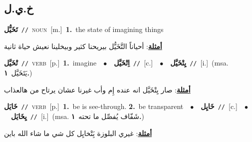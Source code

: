 \documentclass[10pt,a4paper,twoside]{article} %
\begin{document}
\begin{multicols}{2}
\vspace{-3mm}
\subsection*{\color{blue}\foreignlanguage{arabic}{خ.ي.ل}\color{blue}{}} 

{\setlength\topsep{0pt}\textbf{\foreignlanguage{arabic}{تَخَيُّل}}\ {\color{gray}\texttt{//}\color{black}}\ \textsc{noun}\ [m.]\ \textbf{1.}~the state of imagining things\  \begin{flushright}\color{gray}\foreignlanguage{arabic}{\textbf{\underline{\foreignlanguage{arabic}{أمثلة}}}: أحياناً التَّخَيُّل بيريحنا كثير وبيخلينا نعيش حياة ثانية}\end{flushright}\color{black}} \vspace{2mm}

{\setlength\topsep{0pt}\textbf{\foreignlanguage{arabic}{تْخَيَّل}}\ {\color{gray}\texttt{//}\color{black}}\ \textsc{verb}\ [p.]\ \textbf{1.}~imagine\ \ $\bullet$\ \ \setlength\topsep{0pt}\textbf{\foreignlanguage{arabic}{اِتْخَيَّل}}\ {\color{gray}\texttt{//}\color{black}}\ [c.]\ \ $\bullet$\ \ \setlength\topsep{0pt}\textbf{\foreignlanguage{arabic}{يِتْخَيَّل}}\ {\color{gray}\texttt{//}\color{black}}\ [i.]\ \color{gray}(msa. \foreignlanguage{arabic}{يَتَخَيَّل}~\foreignlanguage{arabic}{\textbf{١.}})\color{black}\  \begin{flushright}\color{gray}\foreignlanguage{arabic}{\textbf{\underline{\foreignlanguage{arabic}{أمثلة}}}: صار يِتْخَيَّل انه عنده إِم وأب غيرنا عشان يرتاح من هالعذاب}\end{flushright}\color{black}} \vspace{2mm}

{\setlength\topsep{0pt}\textbf{\foreignlanguage{arabic}{خَايَل}}\ {\color{gray}\texttt{//}\color{black}}\ \textsc{verb}\ [p.]\ \textbf{1.}~be is see-through.  \textbf{2.}~be transparent\ \ $\bullet$\ \ \setlength\topsep{0pt}\textbf{\foreignlanguage{arabic}{خَايِل}}\ {\color{gray}\texttt{//}\color{black}}\ [c.]\ \ $\bullet$\ \ \setlength\topsep{0pt}\textbf{\foreignlanguage{arabic}{يِخَايَل}}\ {\color{gray}\texttt{//}\color{black}}\ [i.]\ \color{gray}(msa. \foreignlanguage{arabic}{شَفّاف يُفصِّل ما تحته}~\foreignlanguage{arabic}{\textbf{١.}})\color{black}\  \begin{flushright}\color{gray}\foreignlanguage{arabic}{\textbf{\underline{\foreignlanguage{arabic}{أمثلة}}}: غيري البلوزة بَِتْخايِل كل شي ما شاء الله باين}\end{flushright}\color{black}} \vspace{2mm}


\end{multicols}
\end{document}
